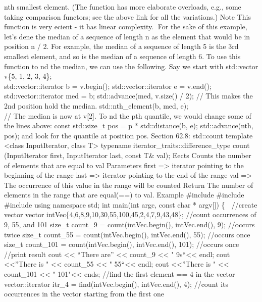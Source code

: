 nth smallest element. (The function has more elaborate overloads, e.g.,
some taking comparison functors; see the above link for all the
variations.) Note This function is very ecient - it has linear
complexity. For the sake of this example, let's dene the median of a
sequence of length n as the element that would be in position n / 2. For
example, the median of a sequence of length 5 is the 3rd smallest
element, and so is the median of a sequence of length 6. To use this
function to nd the median, we can use the following. Say we start with
std::vector v\{5, 1, 2, 3, 4\};\\
std::vector::iterator b = v.begin(); std::vector::iterator e = v.end();
std::vector::iterator med = b; std::advance(med, v.size() / 2); // This
makes the 2nd position hold the median. std::nth\_element(b, med, e);\\
// The median is now at v{[}2{]}. To nd the pth quantile, we would
change some of the lines above: const std::size\_t pos = p *
std::distance(b, e); std::advance(nth, pos); and look for the quantile
at position pos. Section 62.8: std::count template \textless class
InputIterator, class T\textgreater{} typename
iterator\_traits::difference\_type count (InputIterator first,
InputIterator last, const T\& val); Eects Counts the number of elements
that are equal to val Parameters first =\textgreater{} iterator pointing
to the beginning of the range last =\textgreater{} iterator pointing to
the end of the range val =\textgreater{} The occurrence of this value in
the range will be counted Return The number of elements in the range
that are equal(==) to val. Example \#include \#include \#include using
namespace std; int main(int argc, const char * argv{[}{]}) \{  //create
vector vector intVec\{4,6,8,9,10,30,55,100,45,2,4,7,9,43,48\}; //count
occurrences of 9, 55, and 101 size\_t count\_9 = count(intVec.begin(),
intVec.end(), 9); //occurs twice size\_t count\_55 =
count(intVec.begin(), intVec.end(), 55); //occurs once size\_t
count\_101 = count(intVec.begin(), intVec.end(), 101); //occurs once
//print result cout \textless\textless{} ``There are''
\textless\textless{} count\_9 \textless\textless{} "
9s``\textless\textless{} endl; cout \textless\textless{}''There is "
\textless\textless{} count\_55 \textless\textless{} "
55``\textless\textless{} endl; cout \textless\textless{}''There is "
\textless\textless{} count\_101 \textless\textless{} "
101"\textless\textless{} ends; //find the first element == 4 in the
vector vector::iterator itr\_4 = find(intVec.begin(), intVec.end(), 4);
//count its occurrences in the vector starting from the first one
